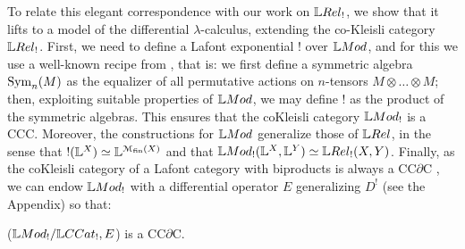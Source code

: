 To relate this elegant correspondence with our work on $\LREL_{!}$, we show that it lifts to a model of the differential $\lambda$-calculus, extending the co-Kleisli category $\LREL_{!}$. 
First, we need to define a Lafont exponential $!$ over $\Mod$, and for this we use a well-known recipe from \cite{Mellies2018, Manzo2013}, that is: we first define a symmetric algebra $\mathrm{Sym}_{n}(M)$ as the equalizer of all permutative actions on $n$-tensors $M\otimes \dots \otimes M$; then, exploiting suitable properties of $\Mod$, we may define $!$ as the product of the symmetric algebras.  
This ensures that the coKleisli category $\Mod_{!}$ is a CCC.
Moreover, the constructions for $\Mod$ generalize those of $\LREL$, in the sense that $!(\mathbb{L}^{X})\simeq \mathbb{L}^{\mathcal{M}_{\mathrm{fin}}(X)}$ and that $\Mod_{!}(\Lawv^{X},\Lawv^{Y})\simeq \LREL_{!}(X,Y)$.
Finally, as the coKleisli category of a Lafont category with biproducts is always a CC$\partial$C \cite[Theorem 21]{LemayCALCO2021}, we can endow $\Mod_{!}$ with a  differential operator $E$ generalizing $D^{!}$ (see the Appendix) so that:
\begin{theorem}\label{thm:lemay}
($\Mod_{!}/\GMet_{!},E$) is a CC$\partial$C.
\end{theorem}




